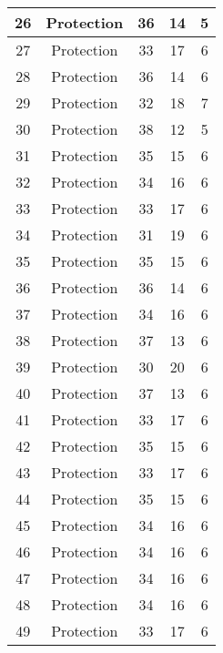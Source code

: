 \documentclass[results.tex]{subfiles}
\begin{document}
\begin{center}
\begin{tabular}{| c || c | c | c | c |}
    \hline
    26 & Protection & 36 & 14 & 5 \\ 
    \hline
    27 & Protection & 33 & 17 & 6 \\ 
    \hline
    28 & Protection & 36 & 14 & 6 \\ 
    \hline
    29 & Protection & 32 & 18 & 7 \\ 
    \hline
    30 & Protection & 38 & 12 & 5 \\ 
    \hline
    31 & Protection & 35 & 15 & 6 \\ 
    \hline
    32 & Protection & 34 & 16 & 6 \\ 
    \hline
    33 & Protection & 33 & 17 & 6 \\ 
    \hline
    34 & Protection & 31 & 19 & 6 \\ 
    \hline
    35 & Protection & 35 & 15 & 6 \\ 
    \hline
    36 & Protection & 36 & 14 & 6 \\ 
    \hline
    37 & Protection & 34 & 16 & 6 \\ 
    \hline
    38 & Protection & 37 & 13 & 6 \\ 
    \hline
    39 & Protection & 30 & 20 & 6 \\ 
    \hline
    40 & Protection & 37 & 13 & 6 \\ 
    \hline
    41 & Protection & 33 & 17 & 6 \\ 
    \hline
    42 & Protection & 35 & 15 & 6 \\ 
    \hline
    43 & Protection & 33 & 17 & 6 \\ 
    \hline
    44 & Protection & 35 & 15 & 6 \\ 
    \hline
    45 & Protection & 34 & 16 & 6 \\ 
    \hline
    46 & Protection & 34 & 16 & 6 \\ 
    \hline
    47 & Protection & 34 & 16 & 6 \\ 
    \hline
    48 & Protection & 34 & 16 & 6 \\ 
    \hline
    49 & Protection & 33 & 17 & 6 \\ 
    \hline   \end{tabular}
\end{center}
\end{document}
